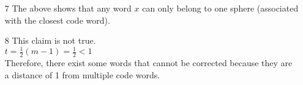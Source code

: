 \begin{enumerate}
\begin{enumerate}
\item[7]
The above shows that any word $x$ can only belong to one sphere (associated with the closest code word).

\item[8]
This claim is not true. \\
$t=\frac{1}{2}(m-1)=\frac{1}{2} < 1$ \\
Therefore, there exist some words that cannot be corrected because they are a distance of 1 from multiple code words.\\
\end{enumerate}

\end{enumerate}

